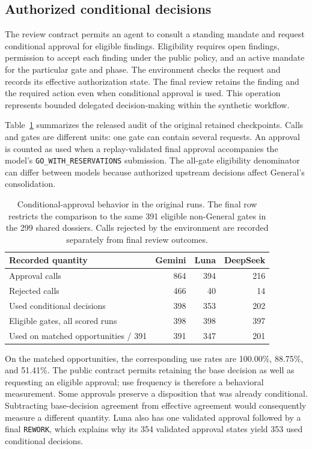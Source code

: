 \subsection{Authorized conditional decisions}

The review contract permits an agent to consult a standing mandate and request conditional
approval for eligible findings. Eligibility requires open findings, permission to accept each
finding under the public policy, and an active mandate for the particular gate and phase.
The environment checks the request and records its effective authorization state. The final
review retains the finding and the required action even when conditional approval is used.
This operation represents bounded delegated decision-making within the synthetic workflow.

Table~\ref{tab:approval-behavior} summarizes the released audit of the original retained
checkpoints. Calls and gates are different units: one gate can contain several requests.
An approval is counted as used when a replay-validated final approval accompanies the model's
\texttt{GO\_WITH\_RESERVATIONS} submission. The all-gate eligibility denominator can differ
between models because authorized upstream decisions affect General's consolidation.

\begin{table}[!htb]
\centering\small
\caption{Conditional-approval behavior in the original runs. The final row restricts the
comparison to the same 391 eligible non-General gates in the 299 shared dossiers. Calls
rejected by the environment are recorded separately from final review outcomes.}
\label{tab:approval-behavior}
\begin{tabular}{@{}lrrr@{}}
\toprule
Recorded quantity & Gemini & Luna & DeepSeek\\
\midrule
Approval calls & 864 & 394 & 216\\
Rejected calls & 466 & 40 & 14\\
Used conditional decisions & 398 & 353 & 202\\
Eligible gates, all scored runs & 398 & 398 & 397\\
Used on matched opportunities / 391 & 391 & 347 & 201\\
\bottomrule
\end{tabular}
\end{table}

On the matched opportunities, the corresponding use rates are 100.00\%, 88.75\%, and 51.41\%.
The public contract permits retaining the base decision as well as requesting an eligible
approval; use frequency is therefore a behavioral measurement. Some approvals preserve a
disposition that was already conditional. Subtracting base-decision agreement from effective
agreement would consequently measure a different quantity. Luna also has one validated
approval followed by a final \texttt{REWORK}, which explains why its 354 validated approval
states yield 353 used conditional decisions.

